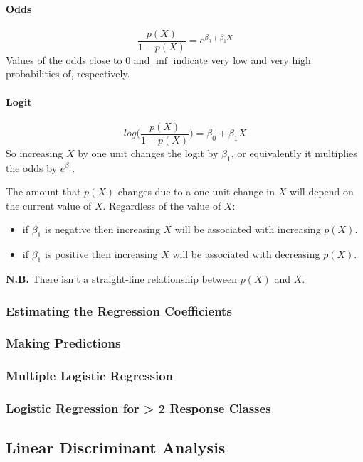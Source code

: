 \documentclass[a4paper]{article}
\begin{document}
			\paragraph{Odds}
			\begin{equation}
				\frac{p(X)}{1 - p(X)} = e^{\beta_0 + \beta_1 X}
			\end{equation}
			Values of the odds close to 0 and $\inf$ indicate very low and very high probabilities of, respectively.
			
			\paragraph{Logit}
			\begin{equation}
				log \Bigg( \frac{p(X)}{1 - p(X)} \Bigg) = \beta_0 + \beta_1 X
			\end{equation}
			So increasing $X$ by one unit changes the logit by $\beta_1$, or equivalently it multiplies the odds by $e^{\beta_1}$.
			
			\hspace{1cm}
			
			The amount that $p(X)$ changes due to a one unit change in $X$ will depend on the current value of $X$.
			Regardless of the value of $X$:
			\begin{itemize}
				\item if $\beta_1$ is negative then increasing $X$ will be associated with increasing $p(X)$.
				\item if $\beta_1$ is positive then increasing $X$ will be associated with decreasing $p(X)$.
			\end{itemize}
			\textbf{N.B.} There isn't a straight-line relationship between $p(X)$ and $X$.
					
		\subsubsection{Estimating the Regression Coefficients}
		
		\subsubsection{Making Predictions}
		
		\subsubsection{Multiple Logistic Regression}
		
		\subsubsection{Logistic Regression for > 2 Response Classes}
		
		
	\subsection{Linear Discriminant Analysis}
	
		
		
	
		
\end{document}
